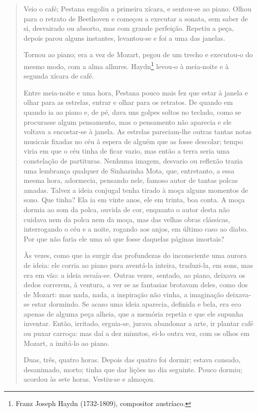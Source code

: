 \begin{quote}
Veio o café; Pestana engoliu a primeira xícara, e sentou-se ao piano.
Olhou para o retrato de Beethoven e começou a executar a sonata, sem
saber de si, desvairado ou absorto, mas com grande perfeição. Repetiu a
peça, depois parou alguns instantes, levantou-se e foi a uma das
janelas.

Tornou ao piano; era a vez de Mozart, pegou de um trecho e executou-o do
mesmo modo, com a alma alhures. Haydn\footnote{Franz Joseph Haydn
  (1732-1809), compositor austríaco.} levou-o à meia-noite e à segunda
xícara de café.

Entre meia-noite e uma hora, Pestana pouco mais fez que estar à janela e
olhar para as estrelas, entrar e olhar para os retratos. De quando em
quando ia ao piano e, de pé, dava uns golpes soltos no teclado, como se
procurasse algum pensamento, mas o pensamento não aparecia e ele voltava
a encostar-se à janela. As estrelas pareciam-lhe outras tantas notas
musicais fixadas no céu à espera de alguém que as fosse descolar; tempo
viria em que o céu tinha de ficar vazio, mas então a terra seria uma
constelação de partituras. Nenhuma imagem, desvario ou reflexão trazia
uma lembrança qualquer de Sinhazinha Mota, que, entretanto, a essa mesma
hora, adormecia, pensando nele, famoso autor de tantas polcas amadas.
Talvez a ideia conjugal tenha tirado à moça alguns momentos de sono. Que
tinha? Ela ia em vinte anos, ele em trinta, boa conta. A moça dormia ao
som da polca, ouvida de cor, enquanto o autor desta não cuidava nem da
polca nem da moça, mas das velhas obras clássicas, interrogando o céu e
a noite, rogando aos anjos, em último caso ao diabo. Por que não faria
ele uma só que fosse daquelas páginas imortais?

Às vezes, como que ia surgir das profundezas do inconsciente uma aurora
de ideia: ele corria ao piano para aventá-la inteira, traduzi-la, em
sons, mas era em vão: a ideia esvaía-se. Outras vezes, sentado, ao
piano, deixava os dedos correrem, à ventura, a ver se as fantasias
brotavam deles, como dos de Mozart: mas nada, nada, a inspiração não
vinha, a imaginação deixava-se estar dormindo. Se acaso uma ideia
aparecia, definida e bela, era eco apenas de alguma peça alheia, que a
memória repetia e que ele supunha inventar. Então, irritado, erguia-se,
jurava abandonar a arte, ir plantar café ou puxar carroça: mas daí a dez
minutos, ei-lo outra vez, com os olhos em Mozart, a imitá-lo ao piano.

Duas, três, quatro horas. Depois das quatro foi dormir; estava cansado,
desanimado, morto; tinha que dar lições no dia seguinte. Pouco dormiu;
acordou às sete horas. Vestiu-se e almoçou.


\end{quote}
